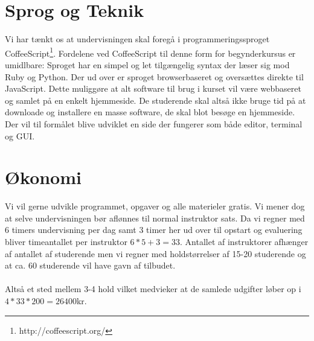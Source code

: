 \documentclass[11pt,a4paper]{article}
\begin{document}
\section{Sprog og Teknik}
Vi har tænkt os at undervisningen skal foregå i programmeringssproget 
CoffeeScript\footnote{http://coffeescript.org/}. Fordelene ved CoffeeScript
til denne form for begynderkursus er umidlbare: Sproget har en simpel og let 
tilgængelig syntax der læser sig mod Ruby og Python. Der ud over er sproget
browserbaseret og oversættes direkte til JavaScript. Dette muliggøre at alt 
software til brug i kurset vil være webbaseret og samlet på en enkelt hjemmeside.
De studerende skal altså ikke bruge tid på at downloade og installere en masse
software, de skal blot besøge en hjemmeside. Der vil til formålet blive udviklet
en side der fungerer som både editor, terminal og GUI.

\section{Økonomi}
Vi vil gerne udvikle programmet, opgaver og alle materieler gratis. Vi mener dog 
at selve undervisningen bør aflønnes til normal instruktor sats. Da vi regner 
med 6 timers undervisning per dag samt 3 timer her ud over til opstart og 
evaluering bliver timeantallet per instruktor $6*5 + 3 = 33$. Antallet af 
instruktorer afhænger af antallet af studerende men vi regner med holdstørrelser
af 15-20 studerende og at ca. 60 studerende vil have gavn af tilbudet.
\\\\
Altså et sted mellem 3-4 hold vilket medvieker at de samlede udgifter løber op
i $4 * 33 * 200 = 26400$kr.
\end{document}
